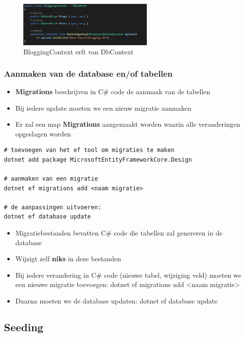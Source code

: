 \documentclass{article}
\begin{document}
\begin{figure}[H]
    \centering
    \includegraphics[width=0.6\textwidth]{efcore-dbcontext.png}
    \caption{BloggingContext erft van DbContext}
\end{figure}

\subsubsection{Aanmaken van de database en/of tabellen}

\begin{itemize}
    \item \textbf{Migrations} beschrijven in C\# code de aanmaak van de tabellen
    \item Bij iedere update moeten we een nieuw migratie aanmaken
    \item Er zal een map \textbf{Migrations} aangemaakt worden waarin alle veranderingen opgeslagen worden
\end{itemize}

\begin{verbatim}
# toevoegen van het ef tool om migraties te maken
dotnet add package MicrosoftEntityFrameworkCore.Design

# aanmaken van een migratie
dotnet ef migrations add <naam migratie>

# de aanpassingen uitvoeren:
dotnet ef database update
\end{verbatim}

\begin{itemize}
    \item Migratiebestanden bevatten C\# code die tabellen zal genereren in de database
    \item Wijzigt zelf \textbf{niks} in deze bestanden
    \item Bij iedere verandering in C\# code (nieuwe tabel, wijziging veld) moeten we een nieuwe migratie toevoegen: dotnet ef migrations add <naam migratie>
    \item Daarna moeten we de database updaten: dotnet ef database update
\end{itemize}

\subsection{Seeding}
\end{document}
